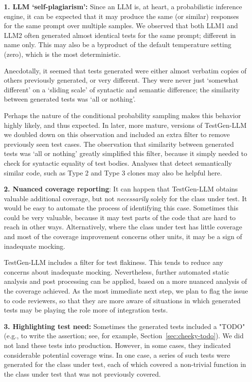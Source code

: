 \documentclass[sigconf,screen]{acmart}
\begin{document}
\medskip
\noindent
{\bf
1. LLM `self-plagiarism':}
Since an LLM is, at heart, a probabilistic inference engine, it can be expected that it may produce the same (or similar) responses for the same prompt over multiple samples.  
We observed that both LLM1 and LLM2 often generated almost  identical tests for the same prompt; different in name only. 
This may also be a byproduct of the default temperature setting (zero), which is the most deterministic.

Anecdotally, it seemed that tests generated were either
almost verbatim copies of others previously generated, or very different.
They were never just `somewhat different' on a `sliding scale' of syntactic and semantic difference; the similarity between generated tests was `all or nothing'.

Perhaps the nature of the conditional probability sampling makes this behavior highly likely, and thus expected. 
In later, more mature, versions of TestGen-LLM we doubled down on this observation and included an extra filter to remove previously seen test cases.
The observation that similarity between generated tests was `all or nothing' greatly simplified this filter, because it simply needed to check for syntactic equality of test bodies.
Analyses that detect semantically similar code, such as Type 2 and Type 3 clones \cite{svajlenko:survey} may also be helpful here.





\medskip
\noindent
{\bf
2. Nuanced coverage reporting}: It can happen that TestGen-LLM obtains valuable additional coverage, but not {\em necessarily} solely for the class under test. 
It would be easy to automate the process of identifying this case.
Sometimes this could be very valuable, because it may test parts of the code that are hard to reach in other ways.
Alternatively, where the class under test has little coverage and most of the coverage improvement concerns other units, it may be a sign of inadequate mocking.

TestGen-LLM includes a filter for test flakiness.
This tends to reduce any concerns about inadequate mocking.
Nevertheless, further automated static analysis and post processing can be applied, based on a more nuanced analysis of the coverage achieved.
As the most immediate next step, we plan to flag the issue to code  reviewers, so that they are more  aware of situations in which
generated tests may be playing the role more of integration tests.


\medskip
\noindent
{\bf
3. Highlighting test need:}
Sometimes the generated tests included a "TODO" (e.g., to write the  assertion; see, for example, Section~\ref{sec:cheeky-todo}). 
We did not land these tests into production.  
However, in some cases, they indicated considerable potential coverage wins.
In one case, a series of such tests were generated for the class under test, each of which covered a non-trivial function in the class under test that was not previously covered.
\end{document}
